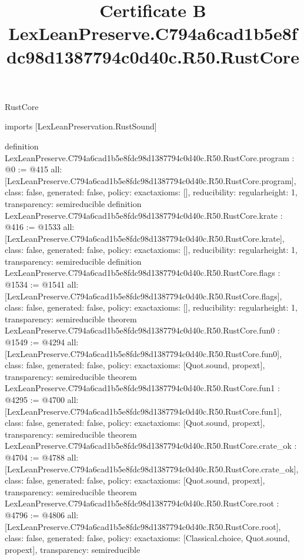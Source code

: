 \begin{lexlean}{RustCore}
\title{Certificate B LexLeanPreserve.C794a6cad1b5e8fdc98d1387794c0d40c.R50.RustCore}
\begin{coremodule}
imports [LexLeanPreservation.RustSound]

definition LexLeanPreserve.C794a6cad1b5e8fdc98d1387794c0d40c.R50.RustCore.program : @0 := @415 {
  all: [LexLeanPreserve.C794a6cad1b5e8fdc98d1387794c0d40c.R50.RustCore.program],
  class: false,
  generated: false,
  policy: exact{axioms: []},
  reducibility: regular{height: 1},
  transparency: semireducible
}
definition LexLeanPreserve.C794a6cad1b5e8fdc98d1387794c0d40c.R50.RustCore.krate : @416 := @1533 {
  all: [LexLeanPreserve.C794a6cad1b5e8fdc98d1387794c0d40c.R50.RustCore.krate],
  class: false,
  generated: false,
  policy: exact{axioms: []},
  reducibility: regular{height: 1},
  transparency: semireducible
}
definition LexLeanPreserve.C794a6cad1b5e8fdc98d1387794c0d40c.R50.RustCore.flags : @1534 := @1541 {
  all: [LexLeanPreserve.C794a6cad1b5e8fdc98d1387794c0d40c.R50.RustCore.flags],
  class: false,
  generated: false,
  policy: exact{axioms: []},
  reducibility: regular{height: 1},
  transparency: semireducible
}
theorem LexLeanPreserve.C794a6cad1b5e8fdc98d1387794c0d40c.R50.RustCore.fun0 : @1549 := @4294 {
  all: [LexLeanPreserve.C794a6cad1b5e8fdc98d1387794c0d40c.R50.RustCore.fun0],
  class: false,
  generated: false,
  policy: exact{axioms: [Quot.sound, propext]},
  transparency: semireducible
}
theorem LexLeanPreserve.C794a6cad1b5e8fdc98d1387794c0d40c.R50.RustCore.fun1 : @4295 := @4700 {
  all: [LexLeanPreserve.C794a6cad1b5e8fdc98d1387794c0d40c.R50.RustCore.fun1],
  class: false,
  generated: false,
  policy: exact{axioms: [Quot.sound, propext]},
  transparency: semireducible
}
theorem LexLeanPreserve.C794a6cad1b5e8fdc98d1387794c0d40c.R50.RustCore.crate_ok : @4704 := @4788 {
  all: [LexLeanPreserve.C794a6cad1b5e8fdc98d1387794c0d40c.R50.RustCore.crate_ok],
  class: false,
  generated: false,
  policy: exact{axioms: [Quot.sound, propext]},
  transparency: semireducible
}
theorem LexLeanPreserve.C794a6cad1b5e8fdc98d1387794c0d40c.R50.RustCore.root : @4796 := @4806 {
  all: [LexLeanPreserve.C794a6cad1b5e8fdc98d1387794c0d40c.R50.RustCore.root],
  class: false,
  generated: false,
  policy: exact{axioms: [Classical.choice, Quot.sound, propext]},
  transparency: semireducible
}


\end{coremodule}
\end{lexlean}
